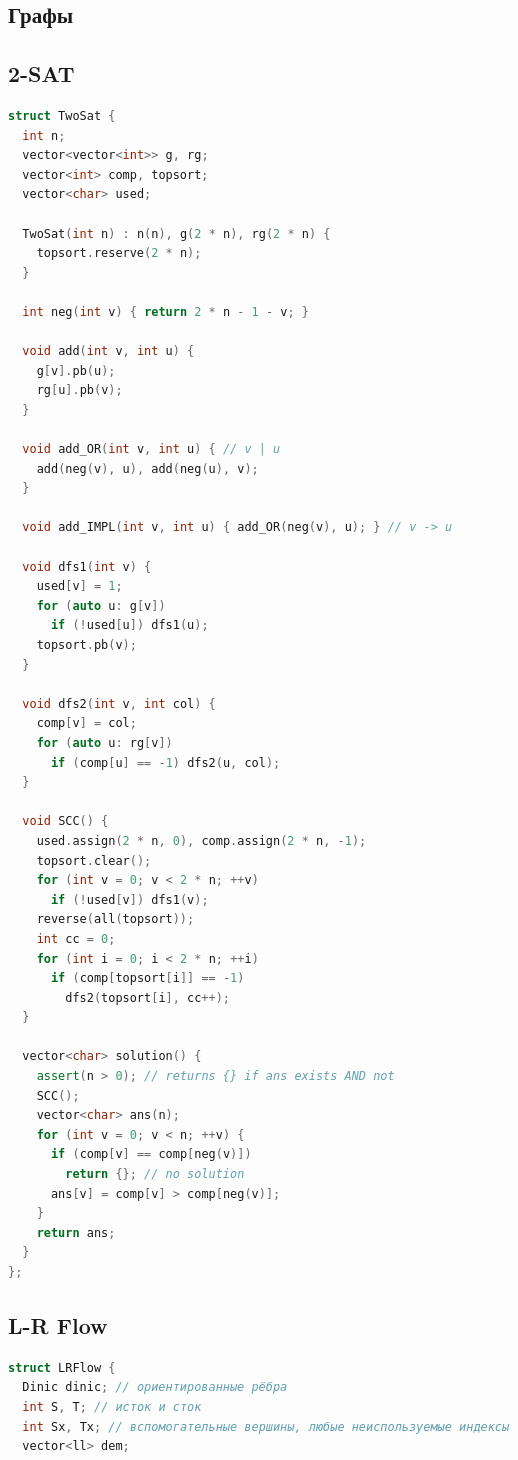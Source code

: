 \documentclass[8pt,a4paper,landscape,twosided]{extarticle}
\begin{document}
\begin{multicols*}{3}
\section{Графы}

\subsection{2-SAT}
\begin{lstlisting}[language=C++]
struct TwoSat {
  int n;
  vector<vector<int>> g, rg;
  vector<int> comp, topsort;
  vector<char> used;

  TwoSat(int n) : n(n), g(2 * n), rg(2 * n) {
    topsort.reserve(2 * n);
  }

  int neg(int v) { return 2 * n - 1 - v; }

  void add(int v, int u) {
    g[v].pb(u);
    rg[u].pb(v);
  }

  void add_OR(int v, int u) { // v | u
    add(neg(v), u), add(neg(u), v);
  }

  void add_IMPL(int v, int u) { add_OR(neg(v), u); } // v -> u

  void dfs1(int v) {
    used[v] = 1;
    for (auto u: g[v])
      if (!used[u]) dfs1(u);
    topsort.pb(v);
  }

  void dfs2(int v, int col) {
    comp[v] = col;
    for (auto u: rg[v])
      if (comp[u] == -1) dfs2(u, col);
  }

  void SCC() {
    used.assign(2 * n, 0), comp.assign(2 * n, -1);
    topsort.clear();
    for (int v = 0; v < 2 * n; ++v)
      if (!used[v]) dfs1(v);
    reverse(all(topsort));
    int cc = 0;
    for (int i = 0; i < 2 * n; ++i)
      if (comp[topsort[i]] == -1)
        dfs2(topsort[i], cc++);
  }

  vector<char> solution() {
    assert(n > 0); // returns {} if ans exists AND not
    SCC();
    vector<char> ans(n);
    for (int v = 0; v < n; ++v) {
      if (comp[v] == comp[neg(v)])
        return {}; // no solution
      ans[v] = comp[v] > comp[neg(v)];
    }
    return ans;
  }
};
\end{lstlisting}

\subsection{L-R Flow}
\begin{lstlisting}[language=C++]
struct LRFlow {
  Dinic dinic; // ориентированные рёбра
  int S, T; // исток и сток
  int Sx, Tx; // вспомогательные вершины, любые неиспользуемые индексы
  vector<ll> dem;


\end{lstlisting}
\end{multicols*}
\end{document}
